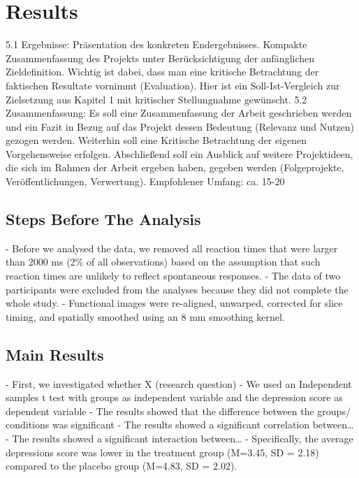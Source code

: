 \chapter{Results}

5.1 Ergebnisse: Präsentation des konkreten Endergebnisses. Kompakte Zusammenfassung des Projekts unter Berücksichtigung der anfänglichen Zieldefinition. Wichtig ist dabei, dass man eine kritische Betrachtung der faktischen Resultate vornimmt (Evaluation). Hier ist ein Soll-Ist-Vergleich zur Zielsetzung aus Kapitel 1 mit kritischer Stellungnahme gewünscht. 5.2 Zusammenfassung: Es soll eine Zusammenfassung der Arbeit geschrieben werden und ein Fazit in Bezug auf das Projekt dessen Bedeutung (Relevanz und Nutzen) gezogen werden. Weiterhin soll eine Kritische Betrachtung der eigenen Vorgehensweise erfolgen. Abschließend soll ein Ausblick auf weitere Projektideen, die sich im Rahmen der Arbeit ergeben haben, gegeben werden (Folgeprojekte, Veröffentlichungen, Verwertung). Empfohlener Umfang: ca. 15-20%

\section{Steps Before The Analysis}
\label{steps-before-analysis}

- Before we analysed the data, we removed all reaction times that were larger than 2000 ms
(2\% of all observations) based on the assumption that such reaction times are unlikely to
reflect spontaneous responses.
- The data of two participants were excluded from the analyses because they did not complete
the whole study.
- Functional images were re-aligned, unwarped, corrected for slice timing, and spatially
smoothed using an 8 mm smoothing kernel.

\section{Main Results}
\label{main-results}

- First, we investigated whether X (research question)
- We used an Independent samples t test with groups as independent variable and the
depression score as dependent variable
- The results showed that the difference between the groups/ conditions was significant
- The results showed a significant correlation between…
- The results showed a significant interaction between…
- Specifically, the average depressions score was lower in the treatment group (M=3.45, SD = 2.18) compared to the placebo group (M=4.83, SD = 2.02).

